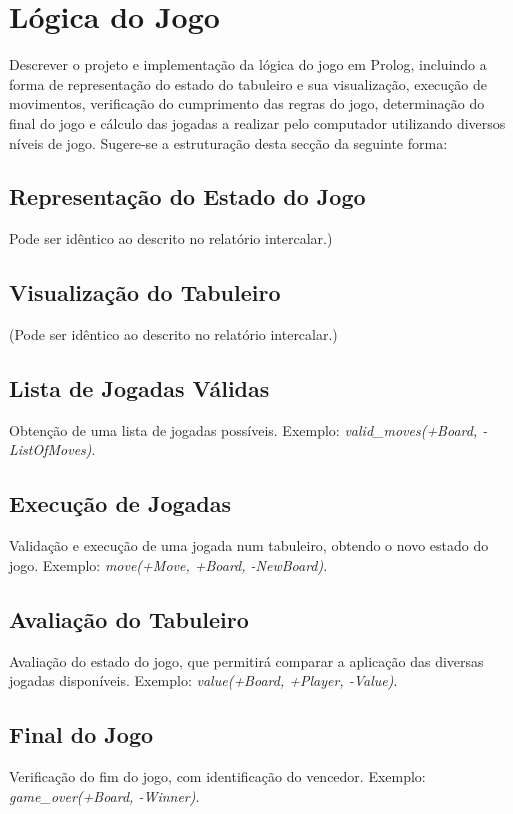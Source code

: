 \documentclass[a4paper]{article}
\begin{document}
\section{Lógica do Jogo}

Descrever o projeto e implementação da lógica do jogo em Prolog, incluindo a forma de representação do estado do tabuleiro e sua visualização, execução de movimentos, verificação do cumprimento das regras do jogo, determinação do final do jogo e cálculo das jogadas a realizar pelo computador utilizando diversos níveis de jogo. Sugere-se a estruturação desta secção da seguinte forma:

\subsection{Representação do Estado do Jogo} Pode ser idêntico ao descrito no relatório intercalar.)

\subsection{Visualização do Tabuleiro} (Pode ser idêntico ao descrito no relatório intercalar.)

\subsection{Lista de Jogadas Válidas} Obtenção de uma lista de jogadas possíveis. Exemplo: \textit{valid\_moves(+Board, -ListOfMoves)}.

\subsection{Execução de Jogadas} Validação e execução de uma jogada num tabuleiro, obtendo o novo estado do jogo. Exemplo: \textit{move(+Move, +Board, -NewBoard)}.

\subsection{Avaliação do Tabuleiro} Avaliação do estado do jogo, que permitirá comparar a aplicação das diversas jogadas disponíveis. Exemplo: \textit{value(+Board, +Player, -Value)}.

\subsection{Final do Jogo} Verificação do fim do jogo, com identificação do vencedor. Exemplo: \textit{game\_over(+Board, -Winner)}.
\end{document}
